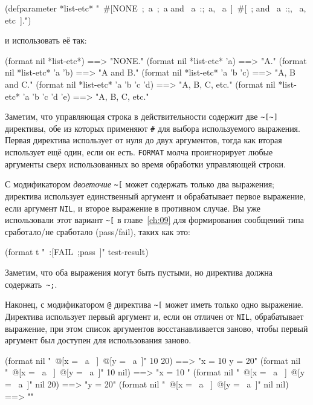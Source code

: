 \begin{myverb}
(defparameter *list-etc*
  "~#[NONE~;~a~;~a and ~a~:;~a, ~a~]~#[~; and ~a~:;, ~a, etc~].")
\end{myverb}

\noindent{}и использовать её так:

\begin{myverb}
(format nil *list-etc*)                ==> "NONE."
(format nil *list-etc* 'a)             ==> "A."
(format nil *list-etc* 'a 'b)          ==> "A and B."
(format nil *list-etc* 'a 'b 'c)       ==> "A, B and C."
(format nil *list-etc* 'a 'b 'c 'd)    ==> "A, B, C, etc."
(format nil *list-etc* 'a 'b 'c 'd 'e) ==> "A, B, C, etc."
\end{myverb}

Заметим, что управляющая строка в действительности содержит две \lstinline!~[~]!
директивы, обе из которых применяют \lstinline!#! для выбора используемого
выражения. Первая директива использует от нуля до двух аргументов, тогда как вторая
использует ещё один, если он есть. \lstinline{FORMAT} молча проигнорирует любые аргументы
сверх использованных во время обработки управляющей строки.

С модификатором \textit{двоеточие} \lstinline!~[! может содержать только два выражения;
директива использует единственный аргумент и обрабатывает первое выражение, если аргумент
\lstinline{NIL}, и второе выражение в противном случае. Вы уже использовали этот вариант
\lstinline!~[! в главе~\ref{ch:09} для формирования сообщений типа сработало/не сработало
(pass/fail), таких как это:

\begin{myverb}
(format t "~:[FAIL~;pass~]" test-result)
\end{myverb}

Заметим, что оба выражения могут быть пустыми, но директива должна содержать~\lstinline!~;!.

Наконец, с модификатором \lstinline!@! директива \lstinline!~[! может иметь только одно
выражение. Директива использует первый аргумент и, если он отличен от \lstinline{NIL},
обрабатывает выражение, при этом список аргументов восстанавливается заново, чтобы первый
аргумент был доступен для использования заново.

\begin{myverb}
(format nil "~@[x = ~a ~]~@[y = ~a~]" 10 20)   ==> "x = 10 y = 20"
(format nil "~@[x = ~a ~]~@[y = ~a~]" 10 nil)  ==> "x = 10 "
(format nil "~@[x = ~a ~]~@[y = ~a~]" nil 20)  ==> "y = 20"
(format nil "~@[x = ~a ~]~@[y = ~a~]" nil nil) ==> ""
\end{myverb}

